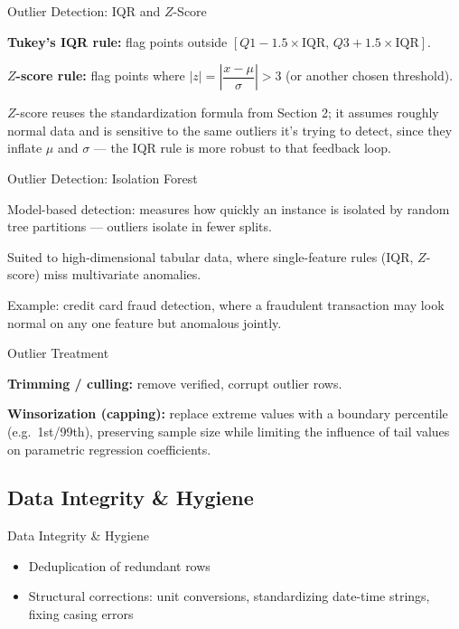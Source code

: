 \begin{frame}{Outlier Detection: IQR and $Z$-Score}
    \begin{sitemize}
        \item \textbf{Tukey's IQR rule:} flag points outside $[Q1 - 1.5 \times \text{IQR}, \, Q3 + 1.5 \times \text{IQR}]$.
        \item \textbf{$Z$-score rule:} flag points where $|z| = \left|\dfrac{x - \mu}{\sigma}\right| > 3$ (or another chosen threshold).
        \item $Z$-score reuses the standardization formula from Section 2; it assumes roughly normal data and is sensitive to the same outliers it's trying to detect, since they inflate $\mu$ and $\sigma$ — the IQR rule is more robust to that feedback loop.
    \end{sitemize}
\end{frame}


\begin{frame}{Outlier Detection: Isolation Forest}
    \begin{sitemize}
        \item Model-based detection: measures how quickly an instance is isolated by random tree partitions — outliers isolate in fewer splits.
        \item Suited to high-dimensional tabular data, where single-feature rules (IQR, $Z$-score) miss multivariate anomalies.
        \item Example: credit card fraud detection, where a fraudulent transaction may look normal on any one feature but anomalous jointly.
    \end{sitemize}
\end{frame}


\begin{frame}{Outlier Treatment}
    \begin{sitemize}
        \item \textbf{Trimming / culling:} remove verified, corrupt outlier rows.
        \item \textbf{Winsorization (capping):} replace extreme values with a boundary percentile (e.g.\ 1st/99th), preserving sample size while limiting the influence of tail values on parametric regression coefficients.
    \end{sitemize}
\end{frame}


\subsection{Data Integrity \& Hygiene}


\begin{frame}{Data Integrity \& Hygiene}
    \begin{itemize}
        \item Deduplication of redundant rows
        \item Structural corrections: unit conversions, standardizing date-time strings, fixing casing errors
    \end{itemize}
\end{frame}
